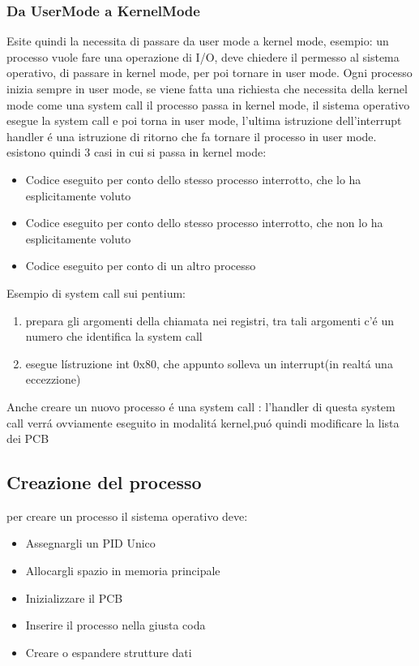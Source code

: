 \documentclass[11pt]{article}
\begin{document}
\subsubsection{Da UserMode a KernelMode}
Esite quindi la necessita di passare da user mode a kernel mode, esempio: un processo vuole fare una operazione di I/O,
deve chiedere il permesso al sistema operativo, di passare in kernel mode, per poi tornare in user mode.
Ogni processo inizia sempre in user mode, se viene fatta una richiesta che necessita della kernel mode come una system call
il processo passa in kernel mode, il sistema operativo esegue la system call e poi torna in user mode, l'ultima istruzione
dell'interrupt handler é una istruzione di ritorno che fa tornare il processo in user mode.
esistono quindi 3 casi in cui si passa in kernel mode:
\begin{itemize}
    \item Codice eseguito per conto dello stesso processo interrotto, che lo ha esplicitamente voluto
    \item Codice eseguito per conto dello stesso processo interrotto, che non lo ha esplicitamente voluto
    \item Codice eseguito per conto di un altro processo
\end{itemize}
Esempio di system call sui pentium:
\begin{enumerate}
    \item prepara gli argomenti della chiamata nei registri, tra tali argomenti c'é un numero che identifica la system call
    \item esegue lístruzione int 0x80, che appunto solleva un interrupt(in realtá una eccezzione)
    \end{enumerate}
Anche creare un nuovo processo é una system call : l'handler di questa system call verrá ovviamente eseguito in modalitá kernel,puó quindi modificare la lista dei PCB
\subsection{Creazione del processo}
per creare un processo il sistema operativo deve:
\begin{itemize}
    \item Assegnargli un PID Unico
    \item Allocargli spazio in memoria principale
    \item Inizializzare il PCB
    \item Inserire il processo nella giusta coda
    \item Creare o espandere strutture dati
\end{itemize}
\end{document}
